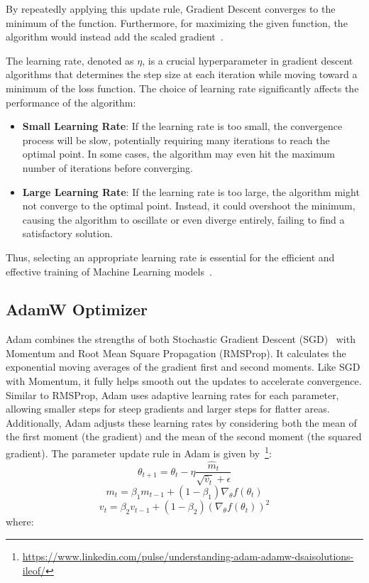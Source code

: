 \documentclass[12pt,a4paper]{report}
\begin{document}
By repeatedly applying this update rule, Gradient Descent converges to the minimum of the function. Furthermore, for maximizing the given function, the algorithm would instead add the scaled gradient~\cite{gradientdescent}.

The learning rate, denoted as \(\eta\), is a crucial hyperparameter in gradient descent algorithms that determines the step size at each iteration while moving toward a minimum of the loss function. The choice of learning rate significantly affects the performance of the algorithm:

\begin{itemize}
  \item \textbf{Small Learning Rate}: If the learning rate is too small, the convergence process will be slow, potentially requiring many iterations to reach the optimal point. In some cases, the algorithm may even hit the maximum number of iterations before converging.
  \item \textbf{Large Learning Rate}: If the learning rate is too large, the algorithm might not converge to the optimal point. Instead, it could overshoot the minimum, causing the algorithm to oscillate or even diverge entirely, failing to find a satisfactory solution.
\end{itemize}

Thus, selecting an appropriate learning rate is essential for the efficient and effective training of Machine Learning models~\cite{gradientdescent}.

\subsection{AdamW Optimizer}

Adam combines the strengths of both Stochastic Gradient Descent (SGD)~\cite{bottou2012stochastic} with Momentum and Root Mean Square Propagation (RMSProp). It calculates the exponential moving averages of the gradient first and second moments. Like SGD with Momentum, it fully helps smooth out the updates to accelerate convergence. Similar to RMSProp, Adam uses adaptive learning rates for each parameter, allowing smaller steps for steep gradients and larger steps for flatter areas. Additionally, Adam adjusts these learning rates by considering both the mean of the first moment (the gradient) and the mean of the second moment (the squared gradient). The parameter update rule in Adam is given by~\footnote{\url{https://www.linkedin.com/pulse/understanding-adam-adamw-dsaisolutions-ileof/}}:
\begin{equation}
  \theta_{t+1} = \theta_t - \eta \frac{\hat{m}_t}{\sqrt{\hat{v}_t} + \epsilon}
\end{equation}
\begin{equation}
  m_t = \beta_1 m_{t-1} + (1 - \beta_1) \nabla_\theta f(\theta_t)
\end{equation}
\begin{equation}
  v_t = \beta_2 v_{t-1} + (1 - \beta_2) (\nabla_\theta f(\theta_t))^2
\end{equation}
where:
\end{document}
